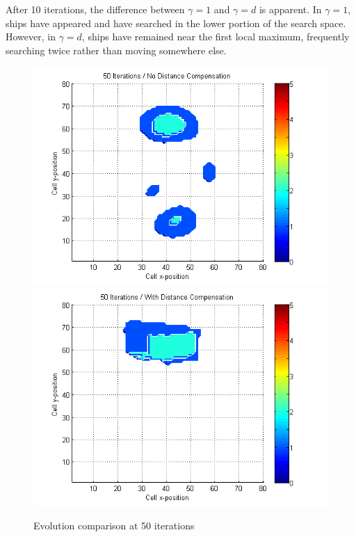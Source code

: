 \documentclass[a4paper]{article}
\begin{document}
After 10 iterations, the difference between $\gamma=1$ and $\gamma=d$ is apparent. In $\gamma=1$, ships have appeared and have searched in the lower portion of the search space. However, in $\gamma=d$, ships have remained near the first local maximum, frequently searching twice rather than moving somewhere else.

\begin{figure}[H]\begin{center}
\includegraphics[scale=0.45]{../Matlab/Images/SearchCountNoDist050.png}
\includegraphics[scale=0.45]{../Matlab/Images/SearchCountDist050.png}
\caption{Evolution comparison at 50 iterations}
\end{center}\end{figure}
\end{document}
